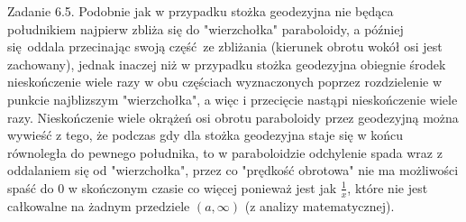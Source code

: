 \documentclass{article}
\begin{document}
Zadanie 6.5.
\newline
\newline
Podobnie jak w przypadku stożka geodezyjna nie będąca południkiem najpierw zbliża się do "wierzchołka" paraboloidy,
a później się oddala przecinając swoją część ze zbliżania (kierunek obrotu wokół osi jest zachowany), jednak inaczej niż w przypadku stożka geodezyjna obiegnie
środek nieskończenie wiele razy w obu częściach wyznaczonych poprzez rozdzielenie w punkcie najblizszym "wierzchołka",
a więc i przecięcie nastąpi nieskończenie wiele razy.\newline
Nieskończenie wiele okrążeń osi obrotu paraboloidy przez geodezyjną można wywieść z tego, że podczas gdy dla stożka geodezyjna staje się w końcu równoległa do
pewnego południka, to w paraboloidzie odchylenie spada wraz z oddalaniem się od "wierzchołka", przez co "prędkość obrotowa"
nie ma możliwości spaść do 0 w skończonym czasie co więcej ponieważ jest jak $\frac{1}{x}$, które nie jest całkowalne na żadnym przedziele $(a,\infty)$
(z analizy matematycznej).
\end{document}
